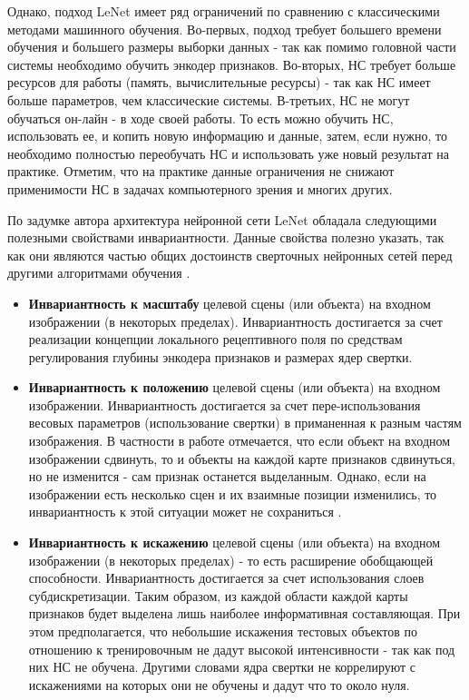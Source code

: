 \documentclass[12pt]{article}
\begin{document}
\begin{sloppypar}
Однако, подход  LeNet имеет ряд ограничений по сравнению с классическими методами машинного обучения. Во-первых, подход требует большего времени обучения и большего размеры выборки данных - так как помимо головной части системы необходимо обучить энкодер признаков. Во-вторых, НС требует больше ресурсов для работы (память, вычислительные ресурсы) - так как НС имеет больше параметров, чем классические системы. В-третьих, НС не могут обучаться он-лайн - в ходе своей работы. То есть можно обучить НС, использовать ее, и копить новую информацию и данные, затем, если нужно, то необходимо полностью переобучать НС и использовать уже новый результат на практике.  
Отметим, что на практике данные ограничения не снижают применимости НС в задачах компьютерного зрения и многих других. 

По задумке автора архитектура нейронной сети LeNet обладала следующими полезными свойствами инвариантности. Данные свойства полезно указать, так как они являются частью общих достоинств сверточных нейронных сетей перед другими алгоритмами обучения \cite{lecun1998gradient, lecun2015deep}.
\begin{itemize}
    \item \textbf{Инвариантность к масштабу} целевой сцены (или объекта) на входном изображении (в некоторых пределах). Инвариантность достигается за счет реализации концепции локального рецептивного поля по средствам регулирования глубины энкодера признаков и размерах ядер свертки. 
    
    \item \textbf{Инвариантность к положению} целевой сцены (или объекта) на входном изображении. Инвариантность достигается за счет пере-использования весовых параметров (использование свертки) в приманенная к разным частям изображения. 
    В частности в работе \cite{lecun1998gradient} отмечается, что если объект на входном изображении сдвинуть, то и объекты на каждой карте признаков сдвинуться, но не изменится - сам признак останется выделанным. Однако, если на изображении есть несколько сцен и их взаимные позиции изменились, то инвариантность к этой ситуации может не сохраниться \cite{lecun1998gradient}.  
    
    \item \textbf{Инвариантность к искажению} целевой сцены (или объекта) на входном изображении (в некоторых пределах) - то есть расширение обобщающей способности. Инвариантность достигается за счет использования слоев субдискретизации. Таким образом, из каждой области каждой карты признаков будет выделена лишь наиболее информативная составляющая. При этом предполагается, что небольшие искажения тестовых объектов по отношению к тренировочным не дадут высокой интенсивности - так как под них НС не обучена. Другими словами ядра свертки не коррелируют с искажениями на которых они не обучены и дадут что то около нуля.
    

\end{itemize}
\end{sloppypar}
\end{document}
